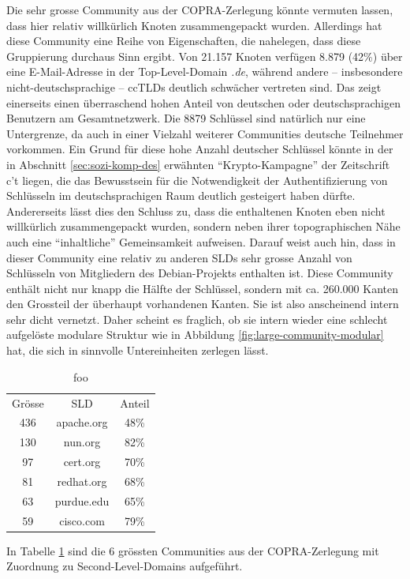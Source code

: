 Die sehr grosse Community aus der COPRA-Zerlegung k\"onnte vermuten
lassen, dass hier relativ willk\"urlich Knoten zusammengepackt
wurden. Allerdings hat diese Community eine Reihe von Eigenschaften,
die nahelegen, dass diese Gruppierung durchaus Sinn ergibt. Von 21.157
Knoten verf\"ugen 8.879 (42\%) \"uber eine E-Mail-Adresse in der
Top-Level-Domain \emph{.de}, w\"ahrend andere -- insbesondere
nicht-deutschsprachige -- ccTLDs deutlich schw\"acher vertreten
sind. Das zeigt einerseits einen \"uberraschend hohen Anteil von
deutschen oder deutschsprachigen Benutzern am Gesamtnetzwerk. Die 8879
Schl\"ussel sind nat\"urlich nur eine Untergrenze, da auch in einer
Vielzahl weiterer Communities deutsche Teilnehmer vorkommen. Ein Grund
f\"ur diese hohe Anzahl deutscher Schl\"ussel k\"onnte in der in
Abschnitt \ref{sec:sozi-komp-des} erw\"ahnten ``Krypto-Kampagne'' der
Zeitschrift c't liegen, die das Bewusstsein f\"ur die Notwendigkeit
der Authentifizierung von Schl\"usseln im deutschsprachigen Raum
deutlich gesteigert haben d\"urfte. Andererseits l\"asst dies den
Schluss zu, dass die enthaltenen Knoten eben nicht willk\"urlich
zusammengepackt wurden, sondern neben ihrer topographischen N\"ahe
auch eine ``inhaltliche'' Gemeinsamkeit aufweisen. Darauf weist auch
hin, dass in dieser Community eine relativ zu anderen SLDs sehr grosse
Anzahl von Schl\"usseln von Mitgliedern des Debian-Projekts enthalten
ist. Diese Community enth\"alt nicht nur knapp die H\"alfte der
Schl\"ussel, sondern mit ca. 260.000 Kanten den Grossteil der
\"uberhaupt vorhandenen Kanten. Sie ist also anscheinend intern sehr
dicht vernetzt. Daher scheint es fraglich, ob sie intern wieder eine
schlecht aufgel\"oste modulare Struktur wie in Abbildung
\ref{fig:large-community-modular} hat, die sich in sinnvolle
Untereinheiten zerlegen l\"asst.

\begin{table}
  \centering
  \begin{tabular}{c|c|c}
    Gr\"osse & SLD & Anteil \\
    436 & apache.org & 48\% \\
    130 & nun.org & 82\% \\
    97 & cert.org & 70\% \\
    81 & redhat.org & 68\% \\
    63 & purdue.edu & 65\% \\
    59 & cisco.com & 79\% 
  \end{tabular}
  \caption{foo}
  \label{tab:ass-examples}
\end{table}
In Tabelle \ref{tab:ass-examples} sind die 6 gr\"ossten Communities
aus der COPRA-Zerlegung mit Zuordnung zu Second-Level-Domains
aufgef\"uhrt.

